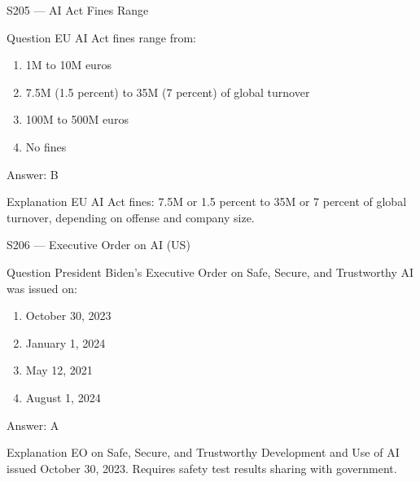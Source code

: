 \documentclass[aspectratio=169,8pt]{beamer}
\begin{document}
	\begin{frame}{S205 --- AI Act Fines Range}
		\begin{block}{Question}
			EU AI Act fines range from:
			\begin{enumerate}
				\item 1M to 10M euros
				\item 7.5M (1.5 percent) to 35M (7 percent) of global turnover
				\item 100M to 500M euros
				\item No fines
			\end{enumerate}
		\end{block}
		\begin{exampleblock}{Answer: B}\end{exampleblock}
		\begin{block}{Explanation}
			EU AI Act fines: 7.5M or 1.5 percent to 35M or 7 percent of global turnover, depending on offense and company size.
		\end{block}
	\end{frame}
	
	\begin{frame}{S206 --- Executive Order on AI (US)}
		\begin{block}{Question}
			President Biden's Executive Order on Safe, Secure, and Trustworthy AI was issued on:
			\begin{enumerate}
				\item October 30, 2023
				\item January 1, 2024
				\item May 12, 2021
				\item August 1, 2024
			\end{enumerate}
		\end{block}
		\begin{exampleblock}{Answer: A}\end{exampleblock}
		\begin{block}{Explanation}
			EO on Safe, Secure, and Trustworthy Development and Use of AI issued October 30, 2023. Requires safety test results sharing with government.
		\end{block}
	\end{frame}
	
\end{document}
